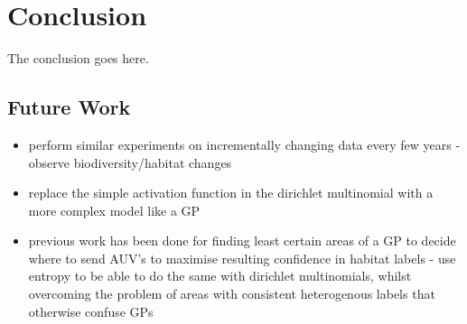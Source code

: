\chapter{Conclusion} \label{chap:conclusion}

The conclusion goes here.

\section{Future Work}

\begin{itemize}
    \item perform similar experiments on incrementally changing data every few years - observe biodiversity/habitat changes
    \item replace the simple activation function in the dirichlet multinomial with a more complex model like a GP
    \item previous work has been done for finding least certain areas of a GP to decide where to send AUV's to maximise resulting confidence in habitat labels - use entropy to be able to do the same with dirichlet multinomials, whilst overcoming the problem of areas with consistent heterogenous labels that otherwise confuse GPs
\end{itemize}

